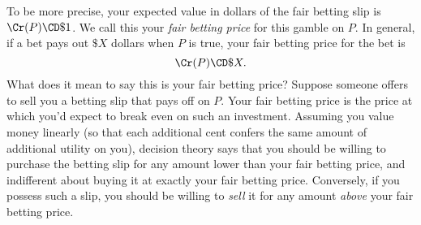 To be more precise, your expected value in dollars of the fair betting slip is $\Cr(P) \CD \$1$. We call this your \textit{fair betting price} for this gamble on $P$. In general, if a bet pays out $\$X$ dollars when $P$ is true, your fair betting price for the bet is
\begin{equation}
\Cr(P) \CD \$X.
\end{equation}  
What does it mean to say this is your fair betting price? Suppose someone offers to sell you a betting slip that pays off on $P$. Your fair betting price is the price at which you'd expect to break even on such an investment. Assuming you value money linearly (so that each additional cent confers the same amount of additional utility on you), decision theory says that you should be willing to purchase the betting slip for any amount lower than your fair betting price, and indifferent about buying it at exactly your fair betting price. Conversely, if you possess such a slip, you should be willing to \emph{sell} it for any amount \emph{above} your fair betting price. 
 
